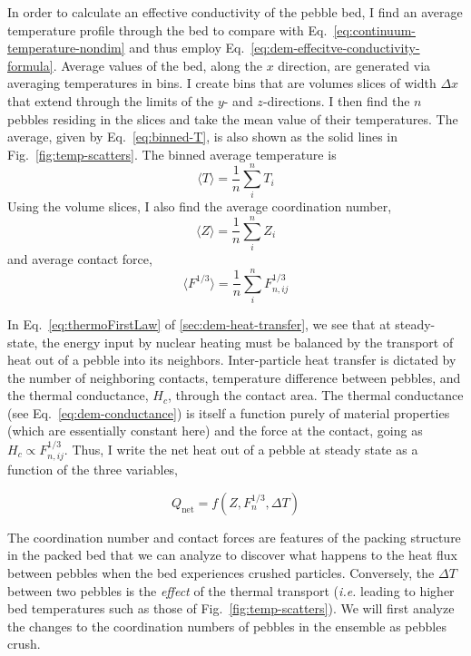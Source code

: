In order to calculate an effective conductivity of the pebble bed, I find an average temperature profile through the bed to compare with Eq.~\ref{eq:continuum-temperature-nondim} and thus employ Eq.~\ref{eq:dem-effecitve-conductivity-formula}. Average values of the bed, along the $x$ direction, are generated via averaging temperatures in bins. I create bins that are volumes slices of width $\Delta x$ that extend through the limits of the $y$- and $z$-directions. I then find the $n$ pebbles residing in the slices and take the mean value of their temperatures. The average, given by Eq.~\ref{eq:binned-T}, is also shown as the solid lines in Fig.~\ref{fig:temp-scatters}. The binned average temperature is 
\begin{equation}\label{eq:binned-T}
	\langle T\rangle = \frac{1}{n}\sum_{i}^n T_i 	
\end{equation}
Using the volume slices, I also find the average coordination number, 
\begin{equation}\label{eq:binned-z}
	\langle Z \rangle = \frac{1}{n}\sum_{i}^n Z_i
\end{equation}
and average contact force, 
\begin{equation}\label{eq:binned-f}
	\langle F^{1/3} \rangle = \frac{1}{n}\sum_{i}^n F_{n,ij}^{1/3}
\end{equation}


In Eq.~\ref{eq:thermoFirstLaw} of \cref{sec:dem-heat-transfer}, we see that at steady-state, the energy input by nuclear heating must be balanced by the transport of heat out of a pebble into its neighbors. Inter-particle heat transfer is dictated by the number of neighboring contacts, temperature difference between pebbles, and the thermal conductance, $H_{c}$, through the contact area. The thermal conductance (see Eq.~\ref{eq:dem-conductance}) is itself a function purely of material properties  (which are essentially constant here) and the force at the contact, going as $H_{c} \propto F_{n,ij}^{1/3}$. Thus, I write the net heat out of a pebble at steady state as a function of the three variables,

\begin{equation}
	Q_\text{net} =f( Z, F_n^{1/3}, \Delta T)
\end{equation}

The coordination number and contact forces are features of the packing structure in the packed bed that we can analyze to discover what happens to the heat flux between pebbles when the bed experiences crushed particles. Conversely, the $\Delta T$ between two pebbles is the \textit{effect} of the thermal transport (\textit{i.e.} leading to higher bed temperatures such as those of Fig.~\ref{fig:temp-scatters}). We will first analyze the changes to the coordination numbers of pebbles in the ensemble as pebbles crush.


